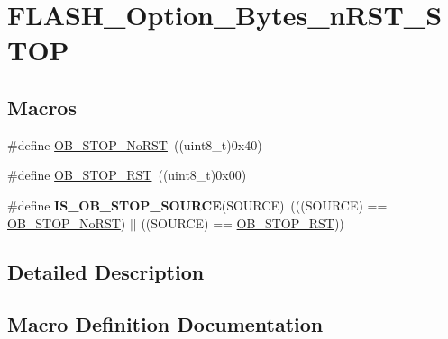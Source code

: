 \hypertarget{group___f_l_a_s_h___option___bytes__n_r_s_t___s_t_o_p}{}\section{F\+L\+A\+S\+H\+\_\+\+Option\+\_\+\+Bytes\+\_\+n\+R\+S\+T\+\_\+\+S\+T\+O\+P}
\label{group___f_l_a_s_h___option___bytes__n_r_s_t___s_t_o_p}
\subsection*{Macros}
\begin{DoxyCompactItemize}
\item 
\#define \hyperlink{group___f_l_a_s_h___option___bytes__n_r_s_t___s_t_o_p_ga6762d6e4045fec58b49dfc03c1927d51}{O\+B\+\_\+\+S\+T\+O\+P\+\_\+\+No\+R\+S\+T}~((uint8\+\_\+t)0x40)
\item 
\#define \hyperlink{group___f_l_a_s_h___option___bytes__n_r_s_t___s_t_o_p_gaef92c03b1f279c532bfa13d3bb074b57}{O\+B\+\_\+\+S\+T\+O\+P\+\_\+\+R\+S\+T}~((uint8\+\_\+t)0x00)
\item 
\hypertarget{group___f_l_a_s_h___option___bytes__n_r_s_t___s_t_o_p_ga131ae3434f300c8317dd6b3b349c7cab}{}\#define {\bfseries I\+S\+\_\+\+O\+B\+\_\+\+S\+T\+O\+P\+\_\+\+S\+O\+U\+R\+C\+E}(S\+O\+U\+R\+C\+E)~(((S\+O\+U\+R\+C\+E) == \hyperlink{group___f_l_a_s_h___option___bytes__n_r_s_t___s_t_o_p_ga6762d6e4045fec58b49dfc03c1927d51}{O\+B\+\_\+\+S\+T\+O\+P\+\_\+\+No\+R\+S\+T}) $\vert$$\vert$ ((S\+O\+U\+R\+C\+E) == \hyperlink{group___f_l_a_s_h___option___bytes__n_r_s_t___s_t_o_p_gaef92c03b1f279c532bfa13d3bb074b57}{O\+B\+\_\+\+S\+T\+O\+P\+\_\+\+R\+S\+T}))\label{group___f_l_a_s_h___option___bytes__n_r_s_t___s_t_o_p_ga131ae3434f300c8317dd6b3b349c7cab}

\end{DoxyCompactItemize}


\subsection{Detailed Description}


\subsection{Macro Definition Documentation}
\hypertarget{group___f_l_a_s_h___option___bytes__n_r_s_t___s_t_o_p_ga6762d6e4045fec58b49dfc03c1927d51}{}
